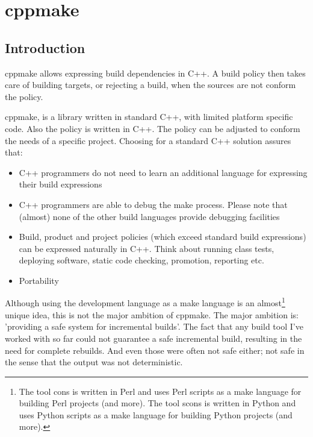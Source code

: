 \chapter{cppmake}
\label{sec:share000.cppmake}
\section{Introduction}
\label{sec:share000.cppmake.introduction}

cppmake allows expressing build dependencies in C++. A build policy then takes
care of building targets, or rejecting a build, when the sources are not conform
the policy.

cppmake, is a library written in standard C++, with limited platform specific
code. Also the policy is written in C++. The policy can be adjusted to conform
the needs of a specific project. Choosing for a standard C++ solution assures that:

\begin{itemize}
\item C++ programmers do not need to learn an additional language for expressing 
      their build expressions
\item C++ programmers are able to debug the make process. Please note that (almost)
      none of the other build languages provide debugging facilities
\item Build, product and project policies (which exceed standard build expressions)
      can be expressed naturally in C++. Think about running class tests, deploying
	  software, static code checking, promotion, reporting etc.
\item Portability
\end{itemize}

Although using the development language as a make language is an almost\footnote{
The tool cons is written in Perl and uses Perl scripts as a make language for building
Perl projects (and more). The tool scons is written in Python and uses Python scripts 
as a make language for building Python projects (and more).}
unique idea, this is not the major ambition of cppmake. The major ambition is: 
'providing a safe system for incremental builds'. The fact that any build tool I've 
worked with so far could not guarantee a safe incremental build, resulting in the 
need for complete rebuilds. And even those were often not safe either; not safe in 
the sense that the output was not deterministic.


